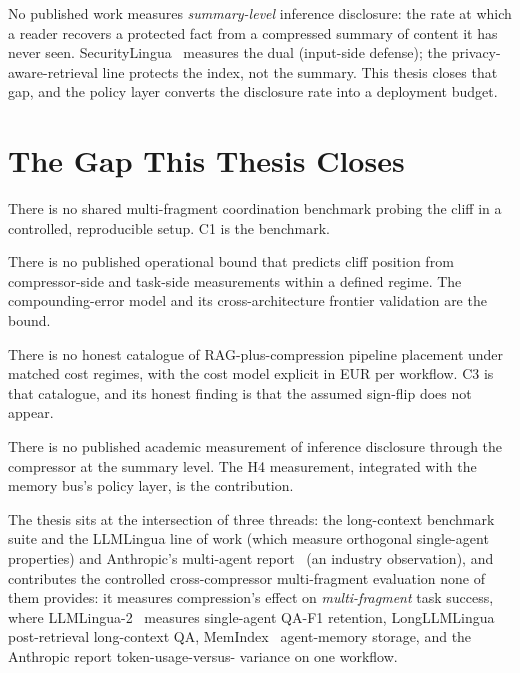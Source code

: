 No published work measures \emph{summary-level} inference disclosure: the
rate at which a reader recovers a protected fact from a compressed
summary of content it has never seen.
SecurityLingua~\cite{li2025securitylingua} measures the dual
(input-side defense); the privacy-aware-retrieval line protects the
index, not the summary. This thesis closes that gap, and the policy
layer converts the disclosure rate into a deployment budget.

\section{The Gap This Thesis Closes}
\label{sec:rw_gap}

There is no shared multi-fragment coordination benchmark
probing the cliff in a controlled, reproducible setup. C1 is the
benchmark.

There is no published operational bound that predicts cliff
position from compressor-side and task-side measurements within
a defined regime. The compounding-error model and its
cross-architecture frontier validation are the bound.

There is no honest catalogue of RAG-plus-compression pipeline
placement under matched cost regimes, with the cost model
explicit in EUR per workflow. C3 is that catalogue, and its
honest finding is that the assumed sign-flip does not appear.

There is no published academic measurement of inference
disclosure through the compressor at the summary level. The H4
measurement, integrated with the memory bus's policy layer, is
the contribution.

The thesis sits at the intersection of three threads: the
long-context benchmark suite and the LLMLingua line of work (which
measure orthogonal single-agent properties) and Anthropic's
multi-agent report~\cite{anthropic2025multiagent} (an industry
observation), and contributes the
controlled cross-compressor multi-fragment evaluation none of them
provides: it measures compression's effect on \emph{multi-fragment}
task success, where LLMLingua-2~\cite{pan2024llmlingua2} measures
single-agent QA-F1 retention, LongLLMLingua~\cite{jiang2024longllmlingua}
post-retrieval long-context QA, MemIndex~\cite{saleh2025memindex}
agent-memory storage, and the Anthropic report token-usage-versus-%
variance on one workflow.
